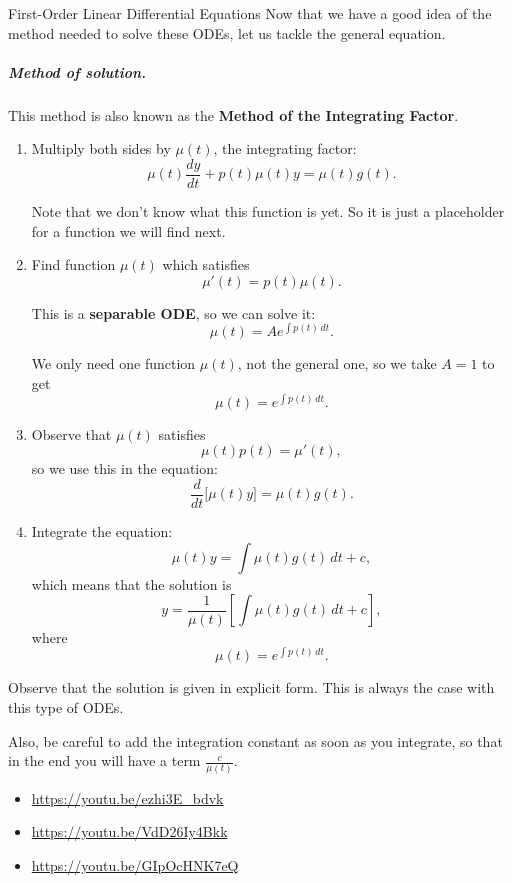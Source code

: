 \begin{submodule}{First-Order Linear Differential Equations}
Now that we have a good idea of the method needed to solve these ODEs, let us tackle the general equation.


\subparagraph{\color{cyan}Method of solution. } This method is also known as the \textbf{\color{cyan}Method of the Integrating Factor}. 
\begin{enumerate}[label={\bf \arabic*. } ]
\item Multiply both sides by $\mu(t)$, the integrating factor:
$$
\mu(t) \frac{dy}{dt} + p(t)\mu(t) y = \mu(t) g(t).
$$

Note that we don't know what this function is yet. So it is just a placeholder for a function we will find next.

\item Find function $\mu(t)$ which satisfies
$$
\mu'(t) = p(t) \mu(t).
$$

This is a \textbf{\color{cyan}separable ODE}, so we can solve it:
$$
\mu(t) = A e^{\int p(t) \, dt}.
$$

We only need one function $\mu(t)$, not the general one, so we take $A=1$ to get
$$
\mu(t) = e^{\int p(t) \, dt}.
$$

\item Observe that $\mu(t)$ satisfies
$$
\mu(t) p(t) = \mu'(t),
$$
so we use this in the equation:
$$
\frac{d}{dt} \big[ \mu(t) y \big] = \mu(t) g(t).
$$

\item Integrate the equation:
$$
\mu(t) y = \int \mu(t) g(t) \, dt + c,
$$
which means that the solution is
$$
y = \frac{1}{\mu(t)} \left[ \int \mu(t) g(t) \, dt + c \right],
$$
where 
$$
\mu(t) = e^{\int p(t) \, dt}.
$$

\end{enumerate}

\begin{important}
	Observe that the solution is given in explicit form. This is always the case with this type of ODEs.
	
	Also, be careful to add the integration constant as soon as you integrate, so that in the end you will have a term $\frac{c}{\mu(t)}$.
\end{important}


\begin{video}
\begin{itemize}
	\item \href{https://youtu.be/ezhi3E_bdvk}{https://youtu.be/ezhi3E\_bdvk} \hfill {}
	\item \href{https://youtu.be/VdD26Iy4Bkk}{https://youtu.be/VdD26Iy4Bkk} \hfill {}
	\item \href{https://youtu.be/GIpOcHNK7eQ}{https://youtu.be/GIpOcHNK7eQ} \hfill {}
\end{itemize}	
\end{video}

\end{submodule}


